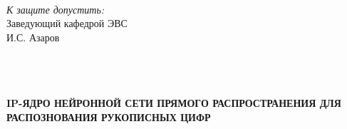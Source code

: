 \newcommand{\targetYear}{2025}

\newcommand{\studentFull}{Е.А. Кривальцевич}
\newcommand{\tutorFull}{М.И. Вашкевич}
\newcommand{\headOfDepartment}{И.С. Азаров}
\newcommand{\consultDepart}{М.И. Вашкевич}
\newcommand{\consultEconom}{И.В. Смирнов}
\newcommand{\normInspect}{Д.С. Лихачев}
\newcommand{\recnspect}{  }
\newcommand{\taskNameFull}{IP-ЯДРО НЕЙРОННОЙ СЕТИ ПРЯМОГО РАСПРОСТРАНЕНИЯ ДЛЯ РАСПОЗНОВАНИЯ РУКОПИСНЫХ ЦИФР}
\newcommand{\docNumber}{БГУИР ДП 1-40 02 02 01 014 ПЗ}
\newcommand{\city}{Минск}


\begin{center}
  \\\vspace{1\baselineskip}
  \\
  \\
  \\

  \begin{flushleft}
     \\\vspace{1\baselineskip}
    \\
  \end{flushleft}

  \noindent
  \begin{flushright}
    \begin{minipage}{0.37\textwidth}
      \raggedright
      \textit{К защите допустить:}\\
      Заведующий кафедрой ЭВС\\
      \underline{\hspace*{2.7cm}} \headOfDepartment
    \end{minipage}
  \end{flushright}

  \vspace{2\baselineskip}

  \\
  \\
  \\\vspace{1\baselineskip}
  \textbf{\MakeUppercase{\taskNameFull}}\\\vspace{1\baselineskip}


\end{center}
